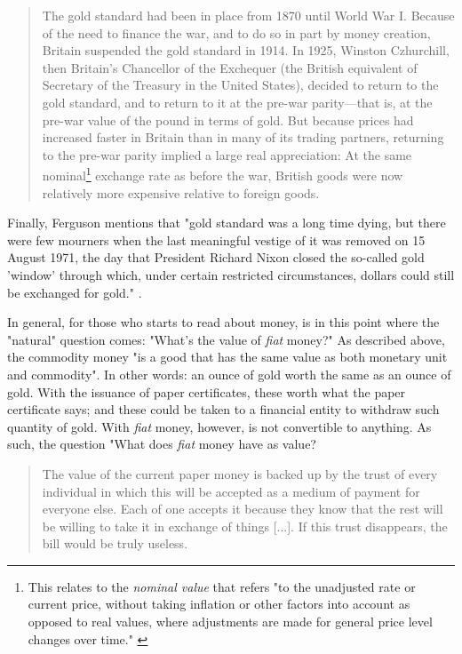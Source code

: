 \documentclass[12pt,a4paper,twoside]{book}
\begin{document}
\begin{quotation}
The gold standard had been in place from 1870 until World War I. Because of the need to finance the war, and to do so in part by money creation, Britain suspended the gold standard in 1914. In 1925, Winston Czhurchill, then Britain’s Chancellor of the Exchequer (the British equivalent of Secretary of the Treasury in the United States), decided to return to the gold standard, and to return to it at the pre-war parity—that is, at the pre-war value of the pound in terms of gold. But because prices had increased faster in Britain than in many of its trading partners, returning to the pre-war parity implied a large real appreciation: At the same nominal\footnote{This relates to the \textit{nominal value} that refers "to the unadjusted rate or current price, without taking inflation or other factors into account as opposed to real values, where adjustments are made for general price level changes over time." \cite{ipedia:nominal}} exchange rate as before the war, British goods were now relatively more expensive relative to foreign goods. \cite[p. 415]{blanchard:macroeconomics}
\end{quotation}

Finally, Ferguson mentions that "gold standard was a long time dying, but there were few mourners when the last meaningful vestige of it was removed on 15 August 1971, the day that President Richard Nixon closed the so-called gold 'window' through which, under certain restricted circumstances, dollars could still be exchanged for gold." \cite[p. 58]{ferguson:ascent-money}.

In general, for those who starts to read about money, is in this point where the "natural" question comes: "What's the value of \textit{fiat} money?" As described above, the commodity money "is a good that has the same value as both monetary unit and commodity". In other words: an ounce of gold worth the same as an ounce of gold. With the issuance of paper certificates, these worth what the paper certificate says; and these could be taken to a financial entity to withdraw such quantity of gold. With \textit{fiat} money, however, is not convertible to anything. As such, the question "What does \textit{fiat} money have as value?

\begin{quotation}
The value of the current paper money is backed up by the trust of every individual in which this will be accepted as a medium of payment for everyone else. Each of one accepts it because they know that the rest will be willing to take it in exchange of things [...]. If this trust disappears, the bill would be truly useless. \cite[p. 266]{mochobeker}
\end{quotation}
\end{document}
